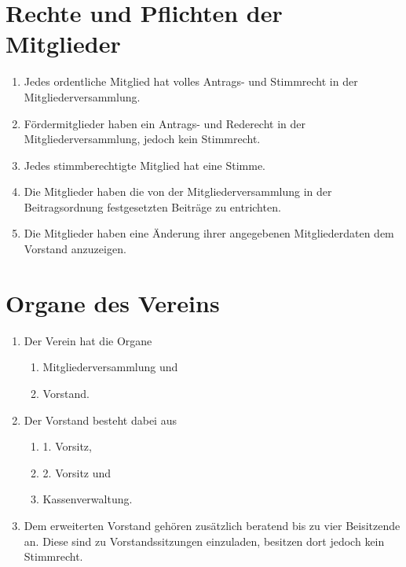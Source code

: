 \documentclass[12pt,paper=a4,ngerman]{scrreprt}
\begin{document}
	\section{Rechte und Pflichten der Mitglieder}
	\begin{enumerate}
		\item
			Jedes ordentliche Mitglied hat volles Antrags- und Stimmrecht in der Mitgliederversammlung.
		\item
			Fördermitglieder haben ein Antrags- und Rederecht in der Mitgliederversammlung, jedoch kein Stimmrecht.
		\item
			Jedes stimmberechtigte Mitglied hat eine Stimme.
		\item
			Die Mitglieder haben die von der Mitgliederversammlung in der Beitragsordnung festgesetzten Beiträge zu entrichten.
		\item
			Die Mitglieder haben eine Änderung ihrer angegebenen Mitgliederdaten dem Vorstand anzuzeigen.
	\end{enumerate}

	\section{Organe des Vereins}
	\begin{enumerate}
		\item
			Der Verein hat die Organe
			\begin{enumerate}
			    \item
			        Mitgliederversammlung und
			    \item
			        Vorstand.
			\end{enumerate}
		\item
             \label{sec:organe:vorstand}
		    Der Vorstand besteht dabei aus
		    \begin{enumerate}
		        \item
		            1. Vorsitz,
	            \item
	                2. Vorsitz und
                \item
                    Kassenverwaltung.
		    \end{enumerate}
	    \item
	        Dem erweiterten Vorstand gehören zusätzlich beratend bis zu vier Beisitzende an. Diese sind zu Vorstandssitzungen einzuladen, besitzen dort jedoch kein Stimmrecht.
	\end{enumerate}
	
\end{document}
